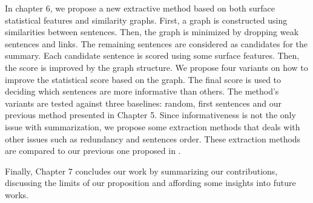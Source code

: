 In chapter 6, we propose a new extractive method based on both surface statistical features and similarity graphs. 
First, a graph is constructed using similarities between sentences. 
Then, the graph is minimized by dropping weak sentences and links. 
The remaining sentences are considered as candidates for the summary. 
Each candidate sentence is scored using some surface features.
Then, the score is improved by the graph structure.
We propose four variants on how to improve the statistical score based on the graph. 
The final score is used to deciding which sentences are more informative than others.
The method's variants are tested against three baselines: random, first sentences and our previous method presented in Chapter 5.
Since informativeness is not the only issue with summarization, we propose some extraction methods that deals with other issues such as redundancy and sentences order.
These extraction methods are compared to our previous one proposed in \citep{15-aries-al}.
 


Finally, Chapter 7 concludes our work by summarizing our contributions, discussing the limits of our proposition and affording some insights into future works.